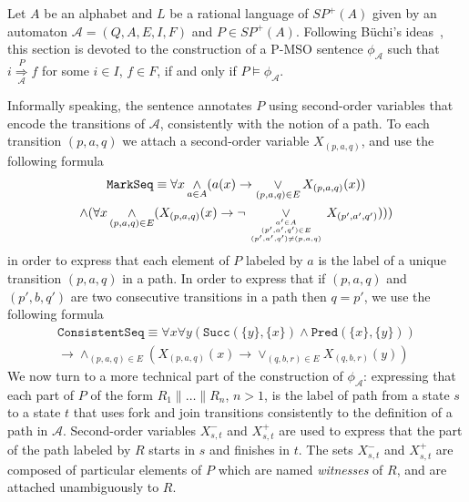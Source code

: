 \documentclass{CSML}
\begin{document}
\noindent Let $A$ be an alphabet and $L$ be a rational language of $SP^+(A)$ given by an automaton $\mathcal{A}=(Q,A,E,I,F)$ and $P\in SP^+(A)$.
Following B\"uchi's ideas~\cite{Buc60}, this section is devoted to the construction of a P-MSO sentence $\phi_\mathcal{A}$ such that $i \mathop{\Longrightarrow}\limits_{\mathcal{A}}^{P} f$ for some $i\in I$, $f\in F$, if and only if $P\models\phi_\mathcal{A}$. 

Informally speaking, the sentence annotates $P$ using second-order variables that encode the transitions of $\mathcal{A}$, consistently with the notion of a path.
To each transition $(p,a,q)$ we attach a second-order variable $X_{(p,a,q)}$, and use the following formula
\begin{multline*}
  \texttt{MarkSeq}\equiv \forall x\mathop\land_{a\in A}(a(x)\rightarrow\mathop\lor_{(p,a,q)\in E}X_{(p,a,q)}(x))\\
  \land(\forall x\mathop\land_{(p,a,q)\in E}(X_{(p,a,q)}(x)\rightarrow\lnot\mathop\lor_{a'\in A\atop {(p',a',q')\in E\atop(p',a',q')\not=(p,a,q)}}X_{(p',a',q')})))
\end{multline*}
in order to express that each element of $P$ labeled by $a$ is the label of a unique transition $(p,a,q)$ in a path. 
In order to express that if $(p,a,q)$ and $(p',b,q')$ are two consecutive transitions in a path then $q=p'$, we use the following formula
\begin{multline*}
  \texttt{ConsistentSeq}\equiv \forall x\forall y(\texttt{Succ}(\{y\},\{x\})\land \texttt{Pred}(\{x\},\{y\}))\\
  \rightarrow \mathop\land_{(p,a,q)\in E}(X_{(p,a,q)}(x)\rightarrow\mathop\lor_{(q,b,r)\in E}X_{(q,b,r)}(y))
\end{multline*}
We now turn to a more technical part of the construction of $\phi_\mathcal{A}$: expressing that each part of $P$ of the form $R_1\parallel\dots\parallel R_n$, $n>1$, is the label of path from a state $s$ to a state $t$ that uses fork and join transitions consistently to the definition of a path in $\mathcal{A}$. 
Second-order variables $X^-_{s,t}$ and $X^+_{s,t}$ are used to express that the part of the path labeled by $R$ starts in $s$ and finishes in $t$. The sets $X^-_{s,t}$ and $X^+_{s,t}$ are composed of particular elements of $P$ which are named \emph{witnesses} of $R$, and are attached unambiguously to $R$.
\end{document}
